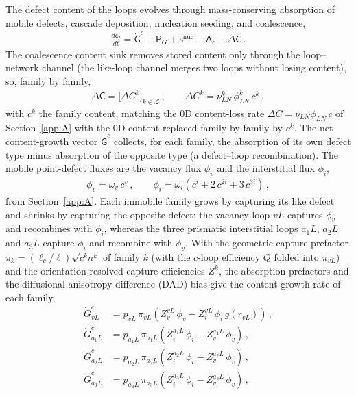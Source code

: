 \documentclass{article}
\newcommand{\spvec}[1]{\bm{\mathsf{#1}}}   %
\begin{document}
The defect content of the loops evolves through mass-conserving absorption of mobile defects, cascade deposition, nucleation seeding, and coalescence,
\begin{align}\label{eq:CIode}
\frac{d\spvec{c}_I}{dt}=
\dot{\spvec{G}}^{c}
+\spvec{P}_G
+\spvec{s}^{\mathrm{nuc}}
-\spvec{A}_c
-\Delta\spvec{C}\, .
\end{align}
The coalescence content sink removes stored content only through the loop--network channel (the like-loop channel merges two loops without losing content), so, family by family,
\begin{align}\label{eq:DeltaC}
\Delta\spvec{C}=\bigl[\Delta C^{k}\bigr]_{k\in\mathcal L}\, ,\qquad
\Delta C^{k}=\nu_{LN}^{k}\,\phi_{LN}^{k}\,c^{k}\, ,
\end{align}
with $c^{k}$ the family content, matching the $0$D content-loss rate $\Delta C=\nu_{LN}\phi_{LN}\,c$ of Section~\ref{app:A} with the $0$D content replaced family by family by $c^{k}$.
The net content-growth vector $\dot{\spvec{G}}^{c}$ collects, for each family, the absorption of its own defect type minus absorption of the opposite type (a defect--loop recombination). The mobile point-defect fluxes are the vacancy flux $\phi_v$ and the interstitial flux $\phi_i$,
\begin{align}\label{eq:fluxdef}
\phi_v=\omega_v\,c^v\, ,\qquad
\phi_i=\omega_i\left(c^i+2\,c^{2i}+3\,c^{3i}\right)\, ,
\end{align}
from Section~\ref{app:A}. Each immobile family grows by capturing its like defect and shrinks by capturing the opposite defect: the vacancy loop $vL$ captures $\phi_v$ and recombines with $\phi_i$, whereas the three prismatic interstitial loops $a_1L$, $a_2L$ and $a_3L$ capture $\phi_i$ and recombine with $\phi_v$. With the geometric capture prefactor $\pi_k=(\ell_c/\ell)\sqrt{c^k n^k}$ of family $k$ (with the $c$-loop efficiency $Q$ folded into $\pi_{vL}$) and the orientation-resolved capture efficiencies $Z^k$, the absorption prefactors and the diffusional-anisotropy-difference (DAD) bias give the content-growth rate of each family,
\begin{align}\label{eq:loopcoupling}
\dot G^{c}_{vL}   &=p_{vL}\,\pi_{vL}\left(Z^{vL}_{v}\,\phi_v-Z^{vL}_{i}\,\phi_i\,g(r_{vL})\right)\, ,\\
\dot G^{c}_{a_1L} &=p_{a_1L}\,\pi_{a_1L}\left(Z^{a_1L}_{i}\,\phi_i-Z^{a_1L}_{v}\,\phi_v\right)\, ,\\
\dot G^{c}_{a_2L} &=p_{a_2L}\,\pi_{a_2L}\left(Z^{a_2L}_{i}\,\phi_i-Z^{a_2L}_{v}\,\phi_v\right)\, ,\\
\dot G^{c}_{a_3L} &=p_{a_3L}\,\pi_{a_3L}\left(Z^{a_3L}_{i}\,\phi_i-Z^{a_3L}_{v}\,\phi_v\right)\, ,
\end{align}
\end{document}
